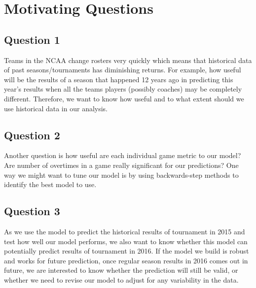 \documentclass{article} %
\begin{document}
\section{Motivating Questions}

\subsection{Question 1}

Teams in the NCAA change rosters very quickly which means that historical data of past seasons/tournaments has diminishing returns. For example, how useful will be the results of a season that happened 12 years ago in predicting this year's results when all the teams players (possibly coaches) may be completely different. Therefore, we want to know how useful and to what extent should we use historical data in our analysis.


\subsection{Question 2}

Another question is how useful are each individual game metric to our model? Are number of overtimes in a game really significant for our predictions? One way we might want to tune our model is by using backwards-step methods to identify the best model to use.



\subsection{Question 3}

As we use the model to predict the historical results of tournament in 2015 and test how well our model performs, we also want to know whether this model can potentially predict results of tournament in 2016. If the model we build is robust and works for future prediction, once regular season results in 2016 comes out in future, we are interested to know whether the prediction will still be valid, or whether we need to revise our model to adjust for any variability in the data.


\end{document}
